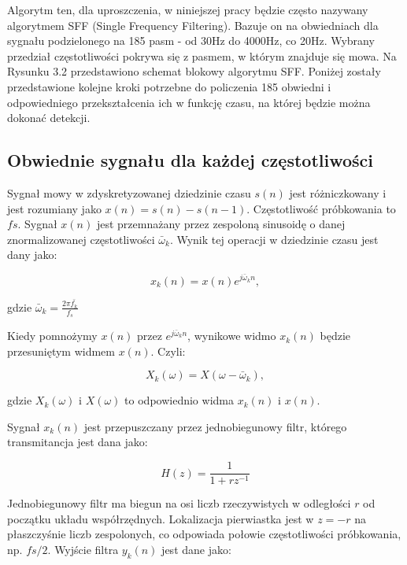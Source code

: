 \documentclass[eng,printmode]{mgr}
\begin{document}
 Algorytm ten, dla uproszczenia, w niniejszej pracy będzie często nazywany algorytmem SFF (Single Frequency Filtering). Bazuje on na obwiedniach dla sygnału podzielonego na 185 pasm - od 30Hz do 4000Hz, co 20Hz. Wybrany przedział częstotliwości pokrywa się z pasmem, w którym znajduje się mowa. Na Rysunku 3.2 przedstawiono schemat blokowy algorytmu SFF. Poniżej zostały przedstawione kolejne kroki potrzebne do policzenia 185 obwiedni i odpowiedniego przekształcenia ich w funkcję czasu, na której będzie można dokonać detekcji.
 
 
 \subsection{Obwiednie sygnału dla każdej częstotliwości}
 Sygnał mowy w zdyskretyzowanej dziedzinie czasu $s(n)$ jest różniczkowany i jest rozumiany jako $x(n) = s(n) - s(n-1)$. Częstotliwość próbkowania to $fs$. Sygnał $x(n)$ jest przemnażany przez zespoloną sinusoidę o danej znormalizowanej częstotliwości $\bar{\omega}_{k}$.  Wynik tej operacji w dziedzinie czasu jest dany jako: 
 
 \begin{equation}
	 x_{k}(n) = x(n)e^{j\bar{\omega}_{k}n},
 \end{equation}
 
 \hspace{8cm}gdzie $\bar{\omega}_{k} = \frac{2\pi\bar{f_{k}}}{f_{s}}$\vspace{5mm}
 
 Kiedy pomnożymy $x(n)$ przez $e^{j\bar{\omega}_{k}n}$, wynikowe widmo $x_{k}(n)$ będzie przesuniętym widmem $x(n)$. Czyli:
 
 \begin{equation}
	 X_{k}(\omega) = X(\omega - \bar{\omega}_{k}),
 \end{equation}
 
 gdzie $X_{k}(\omega)$ i $X(\omega)$ to odpowiednio widma  $x_{k}(n)$ i $x(n)$.\vspace{5mm}
 
 Sygnał $x_{k}(n)$ jest przepuszczany przez jednobiegunowy filtr, którego transmitancja jest dana jako:
 
 \begin{equation}
	 H(z) = \frac{1}{1+rz^{-1}}
 \end{equation}
 
 Jednobiegunowy filtr ma biegun na osi liczb rzeczywistych w odległości $r$ od początku układu współrzędnych. Lokalizacja pierwiastka jest w $z = -r$ na płaszczyśnie liczb zespolonych, co odpowiada połowie częstotliwości próbkowania, np. $fs/2$. Wyjście filtra $y_{k}(n)$ jest dane jako:
 
\end{document}
